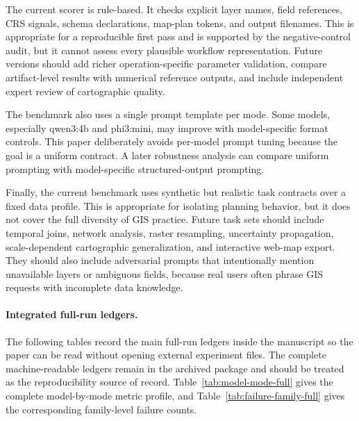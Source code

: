 \documentclass[12pt]{gsis}  %
\begin{document}
The current scorer is rule-based. It checks explicit layer names, field references, CRS signals, schema declarations, map-plan tokens, and output filenames. This is appropriate for a reproducible first pass and is supported by the negative-control audit, but it cannot assess every plausible workflow representation. Future versions should add richer operation-specific parameter validation, compare artifact-level results with numerical reference outputs, and include independent expert review of cartographic quality.

The benchmark also uses a single prompt template per mode. Some models, especially qwen3:4b and phi3:mini, may improve with model-specific format controls. This paper deliberately avoids per-model prompt tuning because the goal is a uniform contract. A later robustness analysis can compare uniform prompting with model-specific structured-output prompting.

Finally, the current benchmark uses synthetic but realistic task contracts over a fixed data profile. This is appropriate for isolating planning behavior, but it does not cover the full diversity of GIS practice. Future task sets should include temporal joins, network analysis, raster resampling, uncertainty propagation, scale-dependent cartographic generalization, and interactive web-map export. They should also include adversarial prompts that intentionally mention unavailable layers or ambiguous fields, because real users often phrase GIS requests with incomplete data knowledge.

\paragraph{Integrated full-run ledgers.}

The following tables record the main full-run ledgers inside the manuscript so the paper can be read without opening external experiment files. The complete machine-readable ledgers remain in the archived package and should be treated as the reproducibility source of record. Table~\ref{tab:model-mode-full} gives the complete model-by-mode metric profile, and Table~\ref{tab:failure-family-full} gives the corresponding family-level failure counts.
\end{document}

